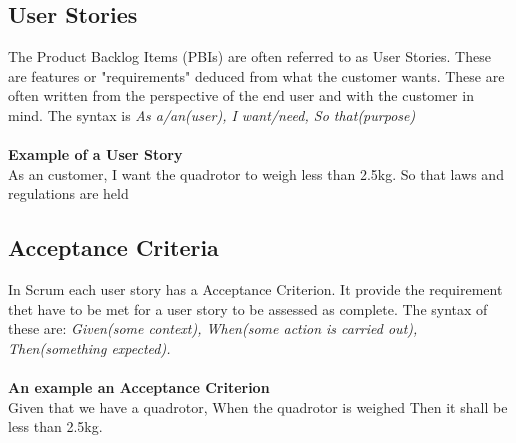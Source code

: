 

\subsection{User Stories}
The Product Backlog Items (PBIs) are often referred to as User Stories. These are features or "requirements" deduced from what the customer wants. These are often written from the perspective of the end user and with the customer in mind. The syntax is \textit{As a/an(user), I want/need, So that(purpose)}
\\ \\
\textbf{Example of a User Story} \\
As an customer, I want the quadrotor to weigh less than 2.5kg. So that laws and regulations are held 

\subsection{Acceptance Criteria}
In Scrum each user story has a Acceptance Criterion. It provide the requirement thet have to be met for a user story to be assessed as complete.  
The syntax of these are: \textit{Given(some context), When(some action is carried out), Then(something expected).} \\
\\ 
\textbf{An example an Acceptance Criterion} \\
Given that we have a quadrotor, When the quadrotor is weighed Then it shall be less than 2.5kg.




